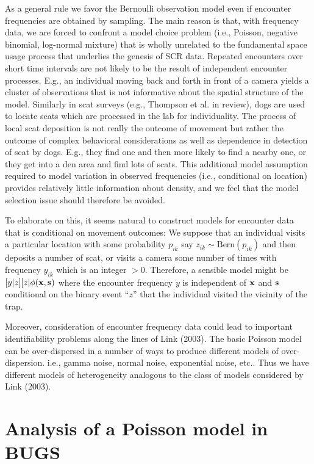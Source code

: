 As a general rule we favor the Bernoulli observation model even if
encounter frequencies are obtained by sampling.  The main reason is
that, with frequency data, we are forced to confront a model choice
problem (i.e., Poisson, negative binomial, log-normal mixture) that is
wholly unrelated to the fundamental space usage process that underlies
the genesis of SCR data. Repeated encounters over short time intervals
are not likely to be the result of independent encounter
processes. E.g., an individual moving back and forth in front of a
camera yields a cluster of observations that is not informative about
the spatial structure of the model. Similarly in scat surveys (e.g.,
Thompson et al. in review), dogs are used to locate scats which are
processed in the lab for individuality.  The process of local scat
deposition is not really the outcome of movement but rather the
outcome of complex behavioral considerations as well as dependence in
detection of scat by dogs. E.g., they find one and then more likely to
find a nearby one, or they get into a den area and find lots of scats.
This additional model assumption required to model variation in
observed frequencies (i.e., conditional on location) provides
relatively little information about density, and we feel that the
model selection issue should therefore be avoided.

To elaborate on this, it seems natural to construct models for
encounter data that is conditional on movement outcomes: We suppose
that an individual visits a particular location with some probability
$p_{ik}$ say $z_{ik}\sim  \mbox{Bern}(p_{ik})$ and then deposits a number of scat,
or visits a camera some number of times with frequency $y_{ik}$ which
is 
an integer $> 0$. Therefore, a sensible model might be
$[y|z][z|\phi({\bf x},{\bf s})$
where the encounter frequency $y$ is independent of ${\bf x}$ and
${\bf s}$ conditional
on the binary event ``$z$'' that the individual visited the vicinity of
the trap.

Moreover, consideration of encounter frequency data could lead to
important identifiability problems along the lines of Link (2003). The
basic Poisson model can be over-dispersed in a number of ways to
produce different models of over-dispersion.  i.e., gamma noise,
normal noise, exponential noise, etc..  Thus we have different models
of heterogeneity analogous to the class of models considered by Link
(2003).

\section{Analysis of a Poisson model in BUGS}

